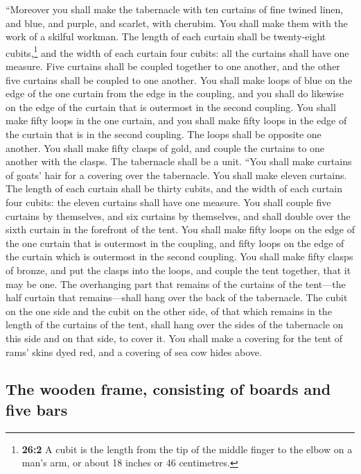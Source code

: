  ``Moreover you shall make the tabernacle with ten
curtains of fine twined linen, and blue, and purple, and scarlet, with
cherubim. You shall make them with the work of a skilful workman.
 The length of each curtain shall be twenty-eight
cubits,\footnote{\textbf{26:2} A cubit is the length from the tip of the
  middle finger to the elbow on a man's arm, or about 18 inches or 46
  centimetres.} and the width of each curtain four cubits: all the
curtains shall have one measure.  Five curtains shall be
coupled together to one another, and the other five curtains shall be
coupled to one another.  You shall make loops of blue on
the edge of the one curtain from the edge in the coupling, and you shall
do likewise on the edge of the curtain that is outermost in the second
coupling.  You shall make fifty loops in the one curtain,
and you shall make fifty loops in the edge of the curtain that is in the
second coupling. The loops shall be opposite one another. 
You shall make fifty clasps of gold, and couple the curtains to one
another with the clasps. The tabernacle shall be a unit. 
``You shall make curtains of goats' hair for a covering over the
tabernacle. You shall make eleven curtains.  The length of
each curtain shall be thirty cubits, and the width of each curtain four
cubits: the eleven curtains shall have one measure.  You
shall couple five curtains by themselves, and six curtains by
themselves, and shall double over the sixth curtain in the forefront of
the tent.  You shall make fifty loops on the edge of the
one curtain that is outermost in the coupling, and fifty loops on the
edge of the curtain which is outermost in the second coupling.
 You shall make fifty clasps of bronze, and put the
clasps into the loops, and couple the tent together, that it may be one.
 The overhanging part that remains of the curtains of the
tent---the half curtain that remains---shall hang over the back of the
tabernacle.  The cubit on the one side and the cubit on
the other side, of that which remains in the length of the curtains of
the tent, shall hang over the sides of the tabernacle on this side and
on that side, to cover it.  You shall make a covering for
the tent of rams' skins dyed red, and a covering of sea cow hides above.

\hypertarget{the-wooden-frame-consisting-of-boards-and-five-bars}{%
\subsection{The wooden frame, consisting of boards and five
bars}\label{the-wooden-frame-consisting-of-boards-and-five-bars}}

